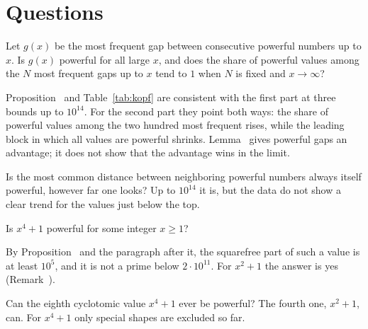 \section{Questions}

\begin{question}
Let $g(x)$ be the most frequent gap between consecutive powerful numbers up to $x$. Is $g(x)$ powerful for all large $x$, and does the share
of powerful values among the $N$ most frequent gaps up to $x$ tend to $1$ when $N$ is fixed and $x \to \infty$?
\end{question}

Proposition~ and Table~\ref{tab:kopf} are consistent with the first part at three bounds up to $10^{14}$. For the second
part they point both ways: the share of powerful values among the two hundred most frequent rises, while the leading block in which all
values are powerful shrinks. Lemma~ gives powerful gaps an advantage; it does not show that the advantage wins in the limit.

\inwords Is the most common distance between neighboring powerful numbers always itself powerful, however far one looks? Up to $10^{14}$ it
is, but the data do not show a clear trend for the values just below the top.

\begin{question}
Is $x^4 + 1$ powerful for some integer $x \ge 1$?
\end{question}

By Proposition~ and the paragraph after it, the squarefree part of such a value is at least $10^5$, and it is not a prime
below $2 \cdot 10^{11}$. For $x^2 + 1$ the answer is yes (Remark~).

\inwords Can the eighth cyclotomic value $x^4 + 1$ ever be powerful? The fourth one, $x^2 + 1$, can. For $x^4 + 1$ only special shapes are
excluded so far.

